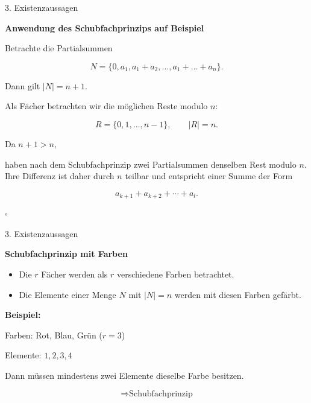 \documentclass{beamer}
\begin{document}
\begin{frame}{3. Existenzaussagen}

\textbf{Anwendung des Schubfachprinzips auf Beispiel}

\vspace{0.3cm}

Betrachte die Partialsummen

\[
N=\{0,a_1,a_1+a_2,\dots,a_1+\dots+a_n\}.
\]

Dann gilt \(|N|=n+1.\)

\vspace{0.3cm}

Als Fächer betrachten wir die möglichen Reste modulo \(n\):

\[
R=\{0,1,\dots,n-1\},
\qquad |R|=n.
\]

\vspace{0.3cm}

Da \(n+1>n,\)

haben nach dem Schubfachprinzip zwei Partialsummen denselben Rest modulo \(n\). Ihre Differenz ist daher durch \(n\) teilbar und entspricht einer Summe der Form

\[
a_{k+1}+a_{k+2}+\cdots+a_l.
\]

\hfill\(\square\)

\end{frame}

\begin{frame}{3. Existenzaussagen}

\textbf{Schubfachprinzip mit Farben}

\begin{itemize}
    \item Die \(r\) Fächer werden als \(r\) verschiedene Farben betrachtet.
    \item Die Elemente einer Menge \(N\) mit \(|N|=n\) werden mit diesen Farben gefärbt.
\end{itemize}

\medskip

\textbf{Beispiel:}

Farben: Rot, Blau, Grün (\(r=3\))

Elemente: \(1,2,3,4\)

\medskip

Dann müssen mindestens zwei Elemente dieselbe Farbe besitzen.

\[
\Longrightarrow
\text{Schubfachprinzip}
\]

\end{frame}
\end{document}
